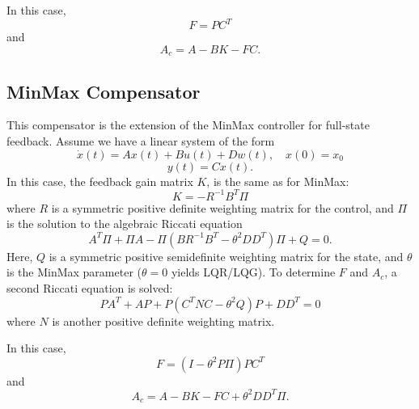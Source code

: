 In this case, $$F = PC^T$$ and $$A_c = A - BK - FC.$$

\subsection{MinMax Compensator}
This compensator is the extension of the MinMax controller for full-state feedback. Assume we have a linear system of the form
$$
\dot x(t) = Ax(t) + Bu(t) + Dw(t), \quad x(0) = x_0
$$
$$ y(t) = Cx(t).$$
 In this case, the feedback gain matrix $K$, is the same as for MinMax:
$$K = -R^{-1} B^T \Pi$$
where $R$ is a symmetric positive definite weighting matrix for the control, and $\Pi$ is the solution to the algebraic Riccati equation
$$A^T\Pi + \Pi A - \Pi (BR^{-1}B^T - \theta^2DD^T) \Pi + Q = 0.$$
Here, $Q$ is a symmetric positive semidefinite weighting matrix for the state, and $\theta$ is the MinMax parameter ($\theta = 0$ yields LQR/LQG).
To determine $F$ and $A_c$, a second Riccati equation is solved:
$$P A^T + AP + P (C^TNC - \theta^2Q)P + DD^T = 0$$
where $N$ is another positive definite weighting matrix.

In this case, $$F = (I - \theta^2 P\Pi)PC^T$$ and $$A_c = A - BK - FC + \theta^2DD^T\Pi.$$
